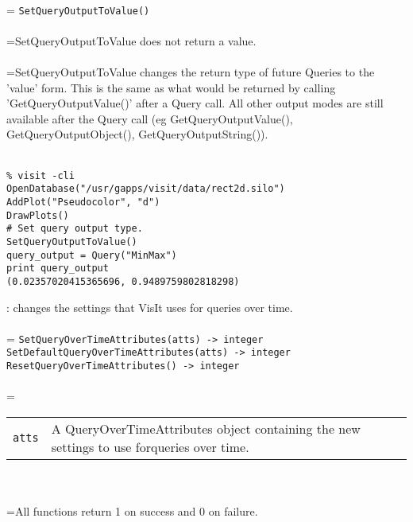 \documentclass[10pt,a4paper]{report}
\begin{document}
 \\ 
\hangindent=\parindent 
\verb!SetQueryOutputToValue()!\\ [-3mm]

 \\ 
\hangindent=\parindent SetQueryOutputToValue does not return a value. \\[-3mm] 

 \\ 
\hangindent=\parindent SetQueryOutputToValue changes the return type of future Queries to the 'value' form. This is the same as what would be returned by calling 'GetQueryOutputValue()' after a Query call. All other output modes are still available after the Query call (eg GetQueryOutputValue(), GetQueryOutputObject(), GetQueryOutputString()). \\[-3mm] 

\\[-6mm]
\begin{verbatim}% visit -cli
OpenDatabase("/usr/gapps/visit/data/rect2d.silo")
AddPlot("Pseudocolor", "d")
DrawPlots()
# Set query output type.
SetQueryOutputToValue()
query_output = Query("MinMax")
print query_output
(0.02357020415365696, 0.9489759802818298)
\end{verbatim}
\newpage


{}
: changes the settings that VisIt uses for queries over time.\\[-3mm]

 \\ 
\hangindent=\parindent 
\verb!SetQueryOverTimeAttributes(atts) -> integer!\\ 
\verb!SetDefaultQueryOverTimeAttributes(atts) -> integer!\\ 
\verb!ResetQueryOverTimeAttributes() -> integer!\\ [-3mm]

 \\ 
\hangindent=\parindent 
\begin{tabular}{lp{9cm}}
\verb!atts! & A QueryOverTimeAttributes object containing the new settings to use forqueries over time. \\
\end{tabular} \\[-2mm]


 \\ 
\hangindent=\parindent All functions return 1 on success and 0 on failure. \\[-3mm] 
\end{document}
